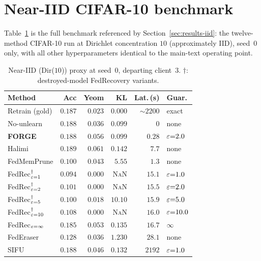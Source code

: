 \section{Near-IID CIFAR-10 benchmark}
\label{app:iid-table}

Table~\ref{tab:iid-benchmark} is the full benchmark referenced by
Section~\ref{sec:results-iid}: the twelve-method CIFAR-10 run at Dirichlet
concentration $10$ (approximately IID), seed~$0$ only, with all other
hyperparameters identical to the main-text operating point.

\begin{table}[h]
\centering
\scriptsize
\setlength{\tabcolsep}{3pt}
\begin{tabular}{lrrrrl}
\toprule
Method & Acc & Yeom & KL & Lat.\,(s) & Guar. \\
\midrule
Retrain (gold)   & $0.187$ & $0.023$ & $0.000$ & $\sim 2200$ & exact \\
No-unlearn       & $0.188$ & $0.036$ & $0.099$ & $0$        & none  \\
\textbf{FORGE}   & $\mathbf{0.188}$ & $\mathbf{0.056}$ & $\mathbf{0.099}$ & $\mathbf{0.28}$ & $\varepsilon{=}2.0$ \\
\midrule
Halimi \cite{halimi2022}              & $0.189$ & $0.061$ & $0.142$ & $7.7$ & none \\
FedMemPrune \cite{wei2026fedmemprune} & $0.100$ & $0.043$ & $5.55$  & $1.3$ & none \\
FedRec$^{\dag}_{\varepsilon{=}1}$            & $0.094$ & $0.000$ & \textsc{NaN} & $15.1$ & $\varepsilon{=}1.0$ \\
FedRec$^{\dag}_{\varepsilon{=}2}$            & $0.101$ & $0.000$ & \textsc{NaN} & $15.5$ & $\varepsilon{=}2.0$ \\
FedRec$^{\dag}_{\varepsilon{=}5}$            & $0.100$ & $0.018$ & $10.10$      & $15.9$ & $\varepsilon{=}5.0$ \\
FedRec$^{\dag}_{\varepsilon{=}10}$           & $0.108$ & $0.000$ & \textsc{NaN} & $16.0$ & $\varepsilon{=}10.0$ \\
FedRec$_{\varepsilon{=}\infty}$              & $0.185$ & $0.053$ & $0.135$ & $16.7$ & $\infty$ \\
FedEraser \cite{liu2021federaser}     & $0.128$ & $0.036$ & $1.230$ & $28.1$ & none \\
SIFU \cite{fraboni2024sifu}           & $0.188$ & $0.046$ & $0.132$ & $2192$ & $\varepsilon{=}1.0$ \\
\bottomrule
\end{tabular}
\caption{Near-IID (Dir($10$)) proxy at seed~$0$, departing client~$3$. $\dag$:
destroyed-model FedRecovery variants.}
\label{tab:iid-benchmark}
\end{table}
